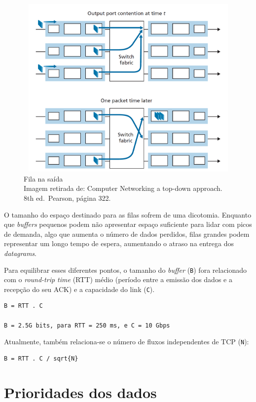 \begin{figure}[h!]
\centering
\includegraphics[keepaspectratio, width=12cm, height=9cm]{imagens/14/14 - output queue.png}
\caption{Fila na saída \\
Imagem retirada de: Computer Networking a top-down approach. 8th
ed.~Pearson, página 322. \\}
\label{fig:Fila na saída}
\end{figure}




O tamanho do espaço destinado para as filas sofrem de uma dicotomia.
Enquanto que \emph{buffers} pequenos podem não apresentar espaço
suficiente para lidar com picos de demanda, algo que aumenta o número de
dados perdidos, filas grandes podem representar um longo tempo de
espera, aumentando o atraso na entrega dos \emph{datagrams}.

Para equilibrar esses diferentes pontos, o tamanho do \emph{buffer}
(\texttt{B}) fora relacionado com o \emph{round-trip time} (RTT) médio
(período entre a emissão dos dados e a recepção do seu ACK) e a
capacidade do link (\texttt{C}).

\begin{verbatim}
B = RTT . C

B = 2.5G bits, para RTT = 250 ms, e C = 10 Gbps
\end{verbatim}

Atualmente, também relaciona-se o número de fluxos independentes de TCP
(\texttt{N}):

\begin{verbatim}
B = RTT . C / sqrt{N} 
\end{verbatim}

\hypertarget{prioridades-dos-dados}{%
\section{Prioridades dos dados}\label{prioridades-dos-dados}}

